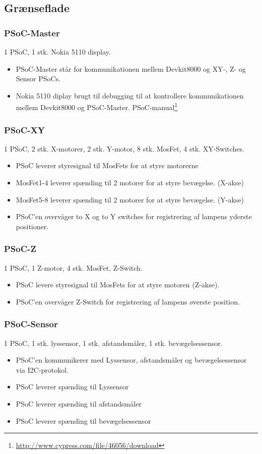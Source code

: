 \subsection{Grænseflade}

\subsubsection{PSoC-Master}
1 PSoC, 1 stk. Nokia 5110 display.
\begin{itemize}
    \item PSoC-Master står for kommunikationen mellem Devkit8000 og XY-, Z- og Sensor PSoCs.
    \item Nokia 5110 diplay brugt til debugging til at kontrollere kommunikationen mellem Devkit8000 og PSoC-Master.
     PSoC-manual\footnote{\url{http://www.cypress.com/file/46056/download}}
\end{itemize}

\subsubsection{PSoC-XY}
1 PSoC, 2 stk. X-motorer, 2 stk. Y-motor, 8 stk. MosFet, 4 stk. XY-Switches.
\begin{itemize}
    \item PSoC leverer styresignal til MosFets for at styre motorerne
    \item MosFet1-4 leverer spænding til 2 motorer for at styre bevægelse. (X-akse)
    \item MosFet5-8 leverer spænding til 2 motorer for at styre bevægelse. (Y-akse)
    \item PSoC’en overvåger to X og to Y switches for registrering af lampens yderste positioner. 
\end{itemize}

\subsubsection{PSoC-Z}
1 PSoC, 1 Z-motor, 4 stk. MosFet, Z-Switch.
\begin{itemize}
    \item PSoC levere styresignal til MosFets for at styre motoren (Z-akse).
    \item PSoC’en overvåger Z-Switch for registrering af lampens øverste position.
\end{itemize}

\subsubsection{PSoC-Sensor}
1 PSoC, 1 stk. lyssensor, 1 stk. afstandsmåler, 1 stk. bevægelsessensor.
\begin{itemize}
    \item PSoC’en kommunikerer med Lyssensor, afstandsmåler og bevægelsessensor via I2C-protokol.
    \item PSoC leverer spænding til Lyssensor
    \item PSoC leverer spænding til afstandsmåler
    \item PSoC leverer spænding til bevægelsessensor
\end{itemize}

